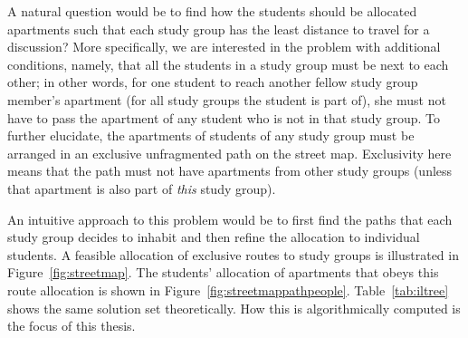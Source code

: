 A natural question would be to find how the students should be
allocated apartments such that each study group has the least distance
to travel for a discussion? More specifically, we are interested in
the problem with additional conditions, namely, that all the students
in a study group must be next to each other; in other words, for one
student to reach another fellow study group member's apartment (for
all study groups the student is part of), she must not have to pass
the apartment of any student who is not in that study group. To
further elucidate, the apartments of students of any study group must
be arranged in an exclusive unfragmented path on the street
map. Exclusivity here means that the path must not have apartments
from other study groups (unless that apartment is also part of {\em
  this} study group).

An intuitive approach to this problem would be to first find the paths
that each study group decides to inhabit and then refine the
allocation to individual students. A feasible allocation of exclusive
routes to study groups is illustrated in Figure~\ref{fig:streetmap}.  The
students' allocation of apartments that obeys this route allocation is
shown in Figure~\ref{fig:streetmappathpeople}. Table~\ref{tab:iltree}
shows the same solution set theoretically.  How this is
algorithmically computed is the focus of this thesis.


